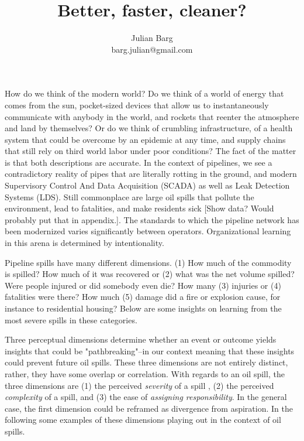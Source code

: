 \documentclass[12pt, man, natbib]{apa6}
\title{Better, faster, cleaner?}
\author{Julian Barg\\barg.julian@gmail.com}
\affiliation{Ivey Business School}
\begin{document}
	
	\maketitle
	
	\singlespacing
	
	\section{}
	How do we think of the modern world? Do we think of a world of energy that comes from the sun, pocket-sized devices that allow us to instantaneously communicate with anybody in the world, and rockets that reenter the atmosphere and land by themselves? Or do we think of crumbling infrastructure, of a health system that could be overcome by an epidemic at any time, and supply chains that still rely on third world labor under poor conditions? The fact of the matter is that both descriptions are accurate. In the context of pipelines, we see a contradictory reality of pipes that are literally rotting in the ground, and modern Supervisory Control And Data Acquisition (SCADA) as well as Leak Detection Systems (LDS). Still commonplace are large oil spills that pollute the environment, lead to fatalities, and make residents sick [Show data? Would probably put that in appendix.]. The standards to which the pipeline network has been modernized varies significantly between operators. Organizational learning in this arena is determined by intentionality.
	
	Pipeline spills have many different dimensions. (1) How much of the commodity is spilled? How much of it was recovered or (2) what was the net volume spilled? Were people injured or did somebody even die? How many (3) injuries or (4) fatalities were there? How much (5) damage did a fire or explosion cause, for instance to residential housing? Below are some insights on learning from the most severe spills in these categories.
	
	Three perceptual dimensions determine whether an event or outcome yields insights that could be "pathbreaking"--in our context meaning that these insights could prevent future oil spills. These three dimensions are not entirely distinct, rather, they have some overlap or correlation. With regards to an oil spill, the three dimensions are (1) the perceived \textit{severity} of a spill \citep[whether the spill is recognized as a "failure",][]{Madsen2010}, (2) the perceived \textit{complexity} of a spill, and (3) the ease of \textit{assigning responsibility}. In the general case, the first dimension could be reframed as divergence from aspiration. In the following some examples of these dimensions playing out in the context of oil spills.
	
\end{document}
